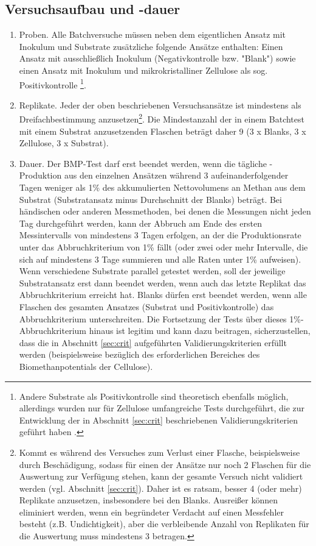 \documentclass[]{article}
\begin{document}
\subsection{Versuchsaufbau und -dauer}
\label{sec:setup}
\begin{enumerate}
  \item Proben. 
    Alle Batchversuche müssen neben dem eigentlichen Ansatz mit Inokulum und Substrate zusätzliche folgende Ansätze enthalten: Einen Ansatz mit ausschließlich Inokulum (Negativkontrolle bzw. "Blank") sowie einen Ansatz mit Inokulum und mikrokristalliner Zellulose als sog. Positivkontrolle
    \footnote{
      Andere Substrate als Positivkontrolle sind theoretisch ebenfalls möglich, allerdings wurden nur für Zellulose umfangreiche Tests durchgeführt, die zur Entwicklung der in Abschnitt \ref{sec:crit} beschriebenen Validierungskriterien geführt haben
      \citep{hafnerImprovingInterlaboratoryReproducibility2020}.
    }.
    \item Replikate. 
    Jeder der oben beschriebenen Versuchsansätze ist mindestens als Dreifachbestimmung anzusetzen\footnote{
      Kommt es während des Versuches zum Verlust einer Flasche, beispielsweise durch Beschädigung, sodass für einen der Ansätze nur noch 2 Flaschen für die Auswertung zur Verfügung stehen, kann der gesamte Versuch nicht validiert werden (vgl. Abschnitt \ref{sec:crit}).
      Daher ist es ratsam, besser 4 (oder mehr) Replikate anzusetzen, insbesondere bei den Blanks.
      Ausreißer können eliminiert werden, wenn ein begründeter Verdacht auf einen Messfehler besteht (z.B. Undichtigkeit), aber die verbleibende Anzahl von Replikaten für die Auswertung muss mindestens 3 betragen.
    }.
    Die Mindestanzahl der in einem Batchtest mit einem Substrat anzusetzenden Flaschen beträgt daher 9 (3 x Blanks, 3 x Zellulose, 3 x Substrat).
  \item Dauer. 
    Der BMP-Test darf erst beendet werden, wenn die tägliche -Produktion aus den einzelnen Ansätzen während 3 aufeinanderfolgender Tagen weniger als 1\% des akkumulierten Nettovolumens an Methan aus dem Substrat (Substratansatz minus Durchschnitt der Blanks) beträgt.
    Bei händischen oder anderen Messmethoden, bei denen die Messungen nicht jeden Tag durchgeführt werden, kann der Abbruch am Ende des ersten Messintervalls von mindestens 3 Tagen erfolgen, an der die Produktionsrate unter das Abbruchkriterium von 1\% fällt (oder zwei oder mehr Intervalle, die sich auf mindestens 3 Tage summieren und alle  Raten unter 1\% aufweisen).
    Wenn verschiedene Substrate parallel getestet werden, soll der jeweilige Substratansatz erst dann beendet werden, wenn auch das letzte Replikat das Abbruchkriterium erreicht hat.
    Blanks dürfen erst beendet werden, wenn alle Flaschen des gesamten Ansatzes (Substrat und Positivkontrolle) das Abbruchkriterium unterschreiten.
    Die Fortsetzung der Tests über dieses 1\%-Abbruchkriterium hinaus ist legitim und kann dazu beitragen, sicherzustellen, dass die in Abschnitt \ref{sec:crit} aufgeführten Validierungskriterien erfüllt werden (beispielsweise bezüglich des erforderlichen Bereiches des Biomethanpotentials der Cellulose).
\end{enumerate}
\end{document}
